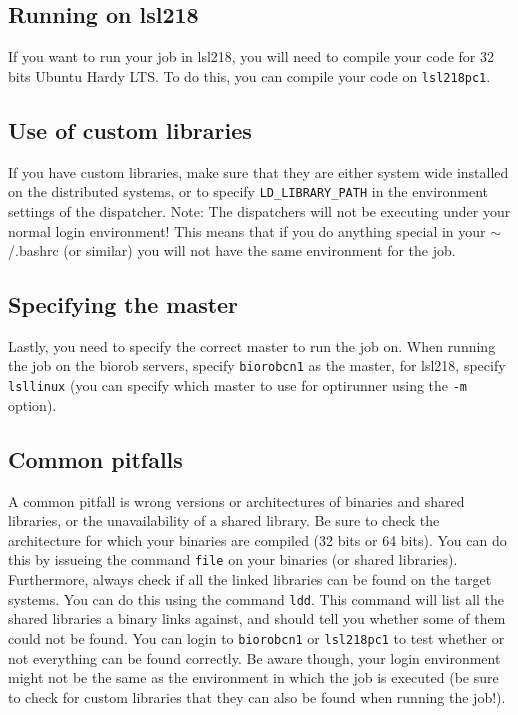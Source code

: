 \documentclass{report}
\begin{document}
\subsection{Running on lsl218}
If you want to run your job in lsl218, you will
need to compile your code for 32 bits Ubuntu Hardy LTS. To do this, you can
compile your code on \verb!lsl218pc1!.

\subsection{Use of custom libraries}
If you have custom libraries, make sure
that they are either system wide installed on the distributed systems, or to
specify \verb!LD_LIBRARY_PATH! in the environment settings of the dispatcher.
Note: The dispatchers will not be executing under your normal login
environment! This means that if you do anything special in your $\sim$/.bashrc
(or similar) you will not have the same environment for the job.

\subsection{Specifying the master}
Lastly, you need to specify the correct master to run the job on. When running
the job on the biorob servers, specify \verb!biorobcn1! as the master, for
lsl218, specify \verb!lsllinux! (you can specify which master to use for
optirunner using the \verb!-m! option).

\subsection{Common pitfalls}
A common pitfall is wrong versions or architectures of binaries and shared
libraries, or the unavailability of a shared library. Be sure to check the
architecture for which your binaries are compiled (32 bits or 64 bits). You
can do this by issueing the command \verb!file! on your binaries (or shared
libraries). Furthermore, always check if all the linked libraries can be found
on the target systems. You can do this using the command \verb!ldd!. This
command will list all the shared libraries a binary links against, and should
tell you whether some of them could not be found. You can login to
\verb!biorobcn1! or \verb!lsl218pc1! to test whether or not everything can
be found correctly. Be aware though, your login environment might not be the
same as the environment in which the job is executed (be sure to check for
custom libraries that they can also be found when running the job!).
\end{document}
